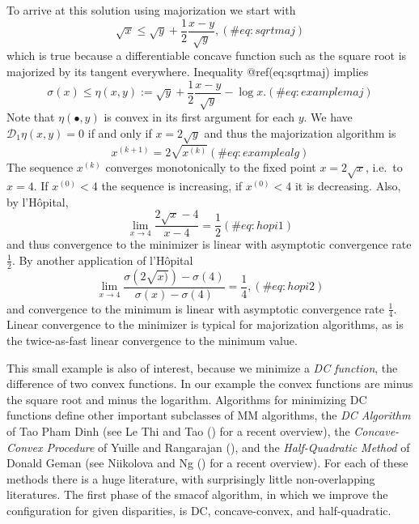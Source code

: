\documentclass[
  12pt,
  letterpaper,
  DIV=11,
  numbers=noendperiod]{scrartcl}
\begin{document}
To arrive at this solution using majorization we start with
\begin{equation}
\sqrt{x}\leq\sqrt{y}+\frac12\frac{x-y}{\sqrt{y}},
(\#eq:sqrtmaj)
\end{equation} which is true because a differentiable concave function
such as the square root is majorized by its tangent everywhere.
Inequality @ref(eq:sqrtmaj) implies \begin{equation}
\sigma(x)\leq\eta(x,y):=\sqrt{y}+\frac12\frac{x-y}{\sqrt{y}}-\log{x}.
(\#eq:examplemaj)
\end{equation} Note that \(\eta(\bullet,y)\) is convex in its first
argument for each \(y\). We have \(\mathcal{D}_1\eta(x,y)=0\) if and
only if \(x=2\sqrt{y}\) and thus the majorization algorithm is
\begin{equation}
x^{(k+1)}=2\sqrt{x^{(k)}}
(\#eq:examplealg)
\end{equation} The sequence \(x^{(k)}\) converges monotonically to the
fixed point \(x=2\sqrt{x}\), i.e.~to \(x=4\). If \(x^{(0)}<4\) the
sequence is increasing, if \(x^{(0)}<4\) it is decreasing. Also, by
l'Hôpital, \begin{equation}
\lim_{x\rightarrow 4}\frac{2\sqrt{x}-4}{x-4}=\frac12
(\#eq:hopi1)
\end{equation} and thus convergence to the minimizer is linear with
asymptotic convergence rate \(\frac12\). By another application of
l'Hôpital \begin{equation}
\lim_{x\rightarrow 4}\frac{\sigma(2\sqrt{x)})-\sigma(4)}{\sigma(x)-\sigma(4)}=\frac14,
(\#eq:hopi2)
\end{equation} and convergence to the minimum is linear with asymptotic
convergence rate \(\frac14\). Linear convergence to the minimizer is
typical for majorization algorithms, as is the twice-as-fast linear
convergence to the minimum value.

This small example is also of interest, because we minimize a \emph{DC
function}, the difference of two convex functions. In our example the
convex functions are minus the square root and minus the logarithm.
Algorithms for minimizing DC functions define other important subclasses
of MM algorithms, the \emph{DC Algorithm} of Tao Pham Dinh (see Le Thi
and Tao () for a recent overview), the
\emph{Concave-Convex Procedure} of Yuille and Rangarajan
(), and the
\emph{Half-Quadratic Method} of Donald Geman (see Niikolova and Ng
() for a recent overview). For each
of these methods there is a huge literature, with surprisingly little
non-overlapping literatures. The first phase of the smacof algorithm, in
which we improve the configuration for given disparities, is DC,
concave-convex, and half-quadratic.
\end{document}
